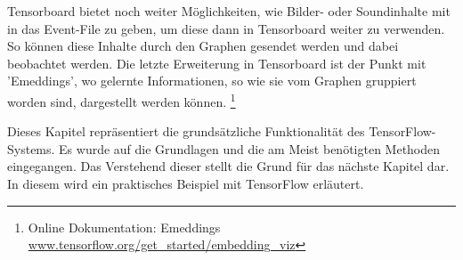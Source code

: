 \noindent
Tensorboard bietet noch weiter Möglichkeiten, wie Bilder- oder Soundinhalte mit in das Event-File zu geben, um diese dann in Tensorboard weiter zu verwenden. 
So können diese Inhalte durch den Graphen gesendet werden und dabei beobachtet werden. 
Die letzte Erweiterung in Tensorboard ist der Punkt mit 'Emeddings', wo gelernte Informationen, so wie sie vom Graphen gruppiert worden sind, dargestellt werden können. \footnote{Online Dokumentation: Emeddings \url{www.tensorflow.org/get_started/embedding_viz}}
\phantom \newline

\noindent
Dieses Kapitel repräsentiert die grundsätzliche Funktionalität des TensorFlow-Systems. 
Es wurde auf die Grundlagen und die am Meist benötigten Methoden eingegangen. 
Das Verstehend dieser stellt die Grund für das nächste Kapitel dar. 
In diesem wird ein praktisches Beispiel mit TensorFlow erläutert. 








